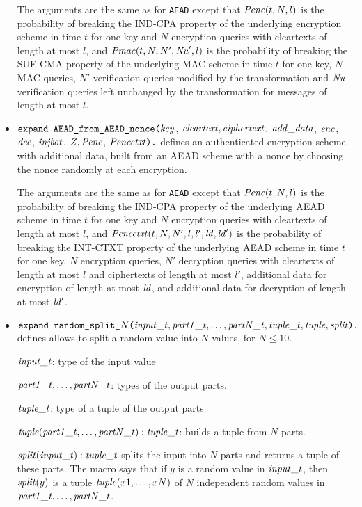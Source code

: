 \documentclass{article}
\begin{document}
\begin{itemize}
The arguments are the same as for \texttt{AEAD} except that $\mathit{Penc}(t, N, l)$ is the probability of breaking the IND-CPA
  property of the underlying encryption scheme in time $t$ for one key and $N$ encryption queries with
  cleartexts of length at most $l$, and
  $\mathit{Pmac}(t, N, N', \mathit{Nu}', l)$ is the probability of breaking the SUF-CMA
   property of the underlying MAC scheme in time $t$ for one key, $N$ MAC queries, $N'$ verification
   queries modified by the transformation and $\mathit{Nu}$ verification
   queries left unchanged by the transformation for messages of length at most $l$.

\item 
   $\texttt{expand\ AEAD\_from\_AEAD\_nonce(}\vn{key}$, $\mathit{cleartext},
   \mathit{ciphertext}$, $\mathit{add\_data}$, $\mathit{enc}$, $\mathit{dec}$, $\mathit{injbot}$, $\mathit{Z},
   \mathit{Penc}$, $\mathit{Pencctxt}\texttt{).}$ defines an authenticated
   encryption scheme with additional data, built from an AEAD scheme with a nonce
   by choosing the nonce randomly at each encryption.

   The arguments are the same as for
   \texttt{AEAD} except that $\mathit{Penc}(t, N,
   l)$ is the probability of breaking the IND-CPA property of the
   underlying AEAD scheme in time $t$ for one key and $N$ encryption
   queries with cleartexts of length at most $l$, and
   $\mathit{Pencctxt}(t, N, N', l, l', \mathit{ld}, \mathit{ld}')$ is the
   probability of breaking the INT-CTXT property of the underlying
   AEAD scheme in time $t$ for one key, $N$ encryption queries, $N'$
   decryption queries with cleartexts of length at most $l$ and
   ciphertexts of length at most $l'$, additional data for encryption
   of length at most $\mathit{ld}$, and additional data for decryption of
   length at most $\mathit{ld}'$.

\item $\texttt{expand\ random\_split\_$N$(}\vn{input\_t}, \vn{part1\_t}, \dots,
\vn{partN\_t}, \vn{tuple\_t}, \vn{tuple}, \vn{split}\texttt{).}$ defines allows to split a random 
value into $N$ values, for $N \leq 10$.
   
  $\mathit{input\_t}$: type of the input value

  $\mathit{part1\_t}, \dots, \mathit{partN\_t}$: types of the output parts.

  $\mathit{tuple\_t}$: type of a tuple of the output parts

  $\mathit{tuple}(\mathit{part1\_t}, \dots, \mathit{partN\_t}): \mathit{tuple\_t}$: builds a tuple from $N$ parts.

  $\mathit{split}(\mathit{input\_t}): \mathit{tuple\_t}$ splits the input into $N$ parts and returns a tuple of these parts. 
  The macro says that if $y$ is a random value in $\mathit{input\_t}$, then
$\mathit{split}(y)$ is a tuple $\mathit{tuple}(x1, \dots, xN)$ of $N$
independent random values in $\mathit{part1\_t}, \dots, \mathit{partN\_t}$.



\end{itemize}
\end{document}
